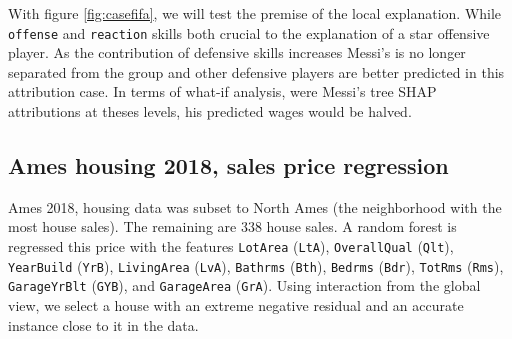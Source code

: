 \documentclass[
]{article}
\begin{document}
With figure \ref{fig:casefifa}, we will test the premise of the local explanation. While \texttt{offense} and \texttt{reaction} skills both crucial to the explanation of a star offensive player. As the contribution of defensive skills increases Messi's is no longer separated from the group and other defensive players are better predicted in this attribution case. In terms of what-if analysis, were Messi's tree SHAP attributions at theses levels, his predicted wages would be halved.

\hypertarget{ames-housing-2018-sales-price-regression}{%
\subsection{Ames housing 2018, sales price regression}\label{ames-housing-2018-sales-price-regression}}

Ames 2018, housing data was subset to North Ames (the neighborhood with the most house sales). The remaining are 338 house sales. A random forest is regressed this price with the features \texttt{LotArea} (\texttt{LtA}), \texttt{OverallQual} (\texttt{Qlt}), \texttt{YearBuild} (\texttt{YrB}), \texttt{LivingArea} (\texttt{LvA}), \texttt{Bathrms} (\texttt{Bth}), \texttt{Bedrms} (\texttt{Bdr}), \texttt{TotRms} (\texttt{Rms}), \texttt{GarageYrBlt} (\texttt{GYB}), and \texttt{GarageArea} (\texttt{GrA}). Using interaction from the global view, we select a house with an extreme negative residual and an accurate instance close to it in the data.
\end{document}
